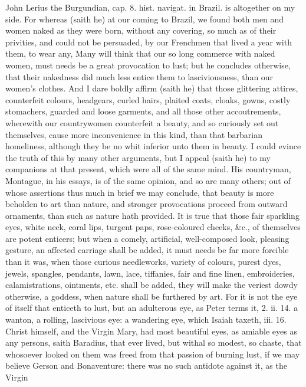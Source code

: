 {John Lerius the Burgundian, cap. 8. hist. navigat. in Brazil. is
altogether on my side. For whereas (saith he) at our coming to Brazil,
we found both men and women naked as they were born, without any
covering, so much as of their privities, and could not be persuaded, by
our Frenchmen that lived a year with them, to wear any, Many will
think that our so long commerce with naked women, must needs be a great
provocation to lust; but he concludes otherwise, that their nakedness
did much less entice them to lasciviousness, than our women's clothes.
And I dare boldly affirm (saith he) that those glittering attires,
counterfeit colours, headgears, curled hairs, plaited coats, cloaks,
gowns, costly stomachers, guarded and loose garments, and all those
other accoutrements, wherewith our countrywomen counterfeit a beauty,
and so curiously set out themselves, cause more inconvenience in this
kind, than that barbarian homeliness, although they be no whit inferior
unto them in beauty. I could evince the truth of this by many other
arguments, but I appeal (saith he) to my companions at that present,
which were all of the same mind. His countryman, Montague, in his
essays, is of the same opinion, and so are many others; out of whose
assertions thus much in brief we may conclude, that beauty is more
beholden to art than nature, and stronger provocations proceed from
outward ornaments, than such as nature hath provided. It is true that
those fair sparkling eyes, white neck, coral lips, turgent paps,
rose-coloured cheeks, \&c., of themselves are potent enticers; but when
a comely, artificial, well-composed look, pleasing gesture, an affected
carriage shall be added, it must needs be far more forcible than it
was, when those curious needleworks, variety of colours, purest dyes,
jewels, spangles, pendants, lawn, lace, tiffanies, fair and fine linen,
embroideries, calamistrations, ointments, etc. shall be added, they
will make the veriest dowdy otherwise, a goddess, when nature shall be
furthered by art. For it is not the eye of itself that enticeth to
lust, but an adulterous eye, as Peter terms it, 2. ii. 14. a wanton, a
rolling, lascivious eye: a wandering eye, which Isaiah taxeth, iii. 16.
Christ himself, and the Virgin Mary, had most beautiful eyes, as
amiable eyes as any persons, saith Baradius, that ever lived, but
withal so modest, so chaste, that whosoever looked on them was freed
from that passion of burning lust, if we may believe Gerson and
Bonaventure: there was no such antidote against it, as the Virgin
}
